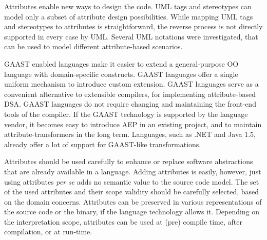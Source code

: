 Attributes enable new ways to design the code. UML tags and stereotypes can model only a subset of attribute design possibilities. While mapping UML tags and stereotypes to attributes is straightforward, the reverse process is not directly supported in every case by UML. Several UML notations were investigated, that can be used to model different attribute-based scenarios. 

GAAST enabled languages make it easier to extend a general-purpose OO language with domain-specific constructs. GAAST languages offer a single uniform mechanism to introduce custom extension. GAAST languages  serve as a convenient alternative to extensible compilers, for implementing attribute-based DSA. GAAST languages do not require changing and maintaining the front-end tools of the compiler. If the GAAST technology is supported by the language vendor, it becomes easy to introduce AEP in an existing project, and to maintain attribute-transformers in the long term. Languages, such as .NET and Java 1.5, already offer a lot of support for GAAST-like transformations.

Attributes should be used carefully to enhance or replace software abstractions that are already available in a language. Adding attributes is easily, however, just using attributes \textit{per se} adds no semantic value to the source code model. The set of the used attributes and their scope validity should be carefully selected, based on the domain concerns. Attributes can be preserved in various representations of the source code or the binary, if the language technology allows it. Depending on the interpretation scope, attributes can be used at (pre) compile time, after compilation, or at run-time.
